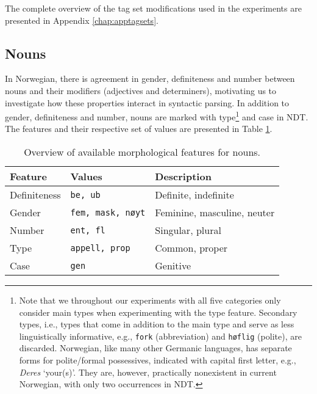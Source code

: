 \documentclass[a4paper,12pt,english]{book}
\begin{document}
The complete overview of the tag set modifications used in the experiments are
presented in Appendix \ref{chap:apptagsets}.

\subsection{Nouns}
\label{sec:expnouns}
In Norwegian, there is agreement in gender, definiteness and number between
nouns and their modifiers (adjectives and determiners), motivating us to
investigate how these properties interact in syntactic parsing. In addition to
gender, definiteness and number, nouns are marked with type\footnote{Note that
    we throughout our experiments with all five categories only consider main
    types when experimenting with the type feature.  Secondary types, i.e.,
    types that come in addition to the main type and serve as less
    linguistically informative, e.g., \texttt{fork} (abbreviation) and
    \texttt{høflig} (polite), are discarded. Norwegian, like many other
    Germanic languages, has separate forms for polite/formal possessives,
    indicated with capital first letter, e.g., \emph{Deres} `your(s)'. They
    are, however, practically nonexistent in current Norwegian, with only two
    occurrences in NDT.} and case in NDT. The features and their respective set
of values are presented in Table \ref{substfeatures}.

\begin{table}
    \centering
    \smaller[0.5]
    \begin{tabular}{@{}lp{5cm}p{5cm}@{}}
        \toprule
        \textbf{Feature} & \textbf{Values} & \textbf{Description} \\
        \midrule
        Definiteness & \texttt{be, ub} & Definite, indefinite \\
        Gender & \texttt{fem, mask, nøyt} & Feminine, masculine, neuter \\
        Number & \texttt{ent, fl} & Singular, plural \\
        Type & \texttt{appell, prop} & Common, proper \\
        Case & \texttt{gen} & Genitive \\
        \bottomrule
    \end{tabular}
    \caption{Overview of available morphological features for nouns.}
    \label{substfeatures}
\end{table}
\end{document}
